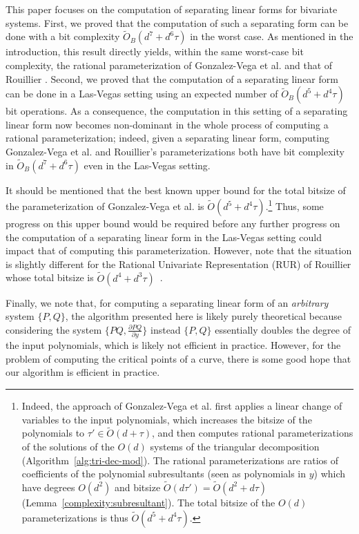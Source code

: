 \documentclass{sig-alternate}
\newcommand{\sO}{\ensuremath{\widetilde{{O}}}}
\newcommand{\sOB}{\ensuremath{\widetilde{{O}}_B}}
\newcommand{\blue}[1]{\color{blue}#1\color{black}\xspace}
\renewcommand{\blue}[1]{#1\xspace}
\begin{document}
This paper focuses on the computation of separating linear forms for bivariate systems.  First, we
proved that the computation of such a separating form can be done with a bit complexity
$\sOB(d^7+d^6\tau)$ in the worst case.  As mentioned in the introduction, this result directly
yields, within the same worst-case bit complexity, the rational parameterization of Gonzalez-Vega et
al. \cite{VegKah:curve2d:96,det-jsc-2009} and 
 that of Rouillier
\cite{Rou99,bouzidiJSC2014a}. Second, we proved that the computation of a separating linear
form can be done in a Las-Vegas setting using an expected number of $\sOB(d^5+d^4\tau)$ bit
operations.  As a consequence, the computation in this setting of a separating linear form now becomes
non-dominant in the whole process of computing a rational parameterization; \blue{indeed, given a
separating linear form, computing Gonzalez-Vega et al. and 
Rouillier's parameterizations both have bit
complexity in $\sOB(d^7+d^6\tau)$ even in the Las-Vegas setting.


It should be mentioned that the best known upper bound for the total bitsize of the parameterization
of Gonzalez-Vega et al. is $\sO(d^5+d^4\tau)$.\footnote{\small Indeed, the approach of Gonzalez-Vega
  et al. first applies a linear change of variables to the input polynomials, which increases the
  bitsize of the polynomials to $\tau'\in\sO(d+\tau)$, and then computes rational parameterizations
  of the solutions of the $O(d)$ systems of the triangular decomposition
  (Algorithm~\ref{alg:tri-dec-mod}). The rational parameterizations are ratios of coefficients of
  the polynomial subresultants (seen as polynomials in $y$) which have degrees $O(d^2)$ and bitsize
  $\sO(d\tau')=\sO(d^2+d\tau)$ (Lemma~\ref{complexity:subresultant}). The total bitsize of the
  $O(d)$ parameterizations is thus $\sO(d^5+d^4\tau)$.}  Thus, some progress on this upper bound
would be required before any further progress on the computation of a separating linear form in the
Las-Vegas setting could impact that of computing this parameterization.  However, note that the
situation is slightly different for the Rational Univariate Representation (RUR) of Rouillier
\cite{Rou99} whose total bitsize is $\sO(d^4+d^3\tau)$~\cite[Theorem 22]{bouzidiJSC2014a}.


Finally, we note that, for computing a separating linear form of an
\emph{arbitrary} system $\{P,Q\}$,  the algorithm presented here is likely purely theoretical
because considering the system $\{PQ,\frac{\partial PQ}{\partial y}\}$ instead $\{P,Q\}$ essentially doubles the
degree of the input polynomials, which is likely not efficient in practice. However, for the problem
of computing the critical points of a curve, there is some
good hope that our  algorithm is efficient in practice.}





     









\small

 
\end{document}
